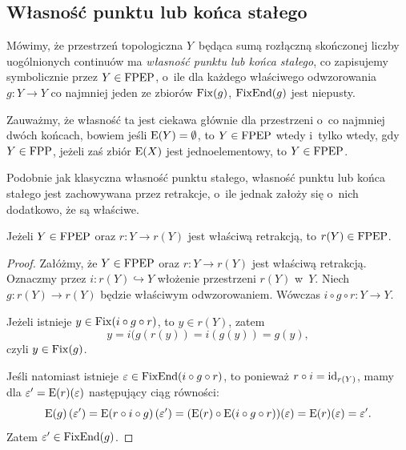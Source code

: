 


\subsection{Własność punktu lub końca stałego}
Mówimy, że przestrzeń topologiczna $Y$~będąca sumą rozłączną skończonej liczby uogólnionych continuów ma \textit{własność punktu lub końca stałego}, co zapisujemy symbolicznie przez $Y\in\mathrm{FPEP}$, o~ile dla każdego właściwego odwzorowania $g\colon Y\to Y$ co najmniej jeden ze zbiorów $\operatorname{Fix}(g)$, $\operatorname{FixEnd}(g)$ jest niepusty.

Zauważmy, że własność ta jest ciekawa głównie dla przestrzeni o~co najmniej dwóch końcach, bowiem jeśli $\mathrm{E}(Y)=\emptyset$, to $Y\in\mathrm{FPEP}$ wtedy i~tylko wtedy, gdy $Y\in\mathrm{FPP}$, jeżeli zaś zbiór $\mathrm{E}(X)$ jest  jednoelementowy, to $Y\in\mathrm{FPEP}$. 

Podobnie jak klasyczna własność punktu stałego, własność punktu lub końca stałego jest zachowywana przez retrakcje, o~ile jednak założy się o~nich dodatkowo, że są właściwe.

\begin{stw}\label{stw-wlasciwa_retrakcja_zachowuje_fpep}
Jeżeli $Y\in\mathrm{FPEP}$ oraz $r\colon Y\to r(Y)$ jest właściwą retrakcją, to $r(Y)\in\mathrm{FPEP}$.
\end{stw}
\begin{proof}
Załóżmy, że $Y\in\mathrm{FPEP}$ oraz $r\colon Y\to r(Y)$ jest właściwą retrakcją. Oznaczmy przez $i\colon r(Y)\hookrightarrow Y$ włożenie przestrzeni $r(Y)$ w~$Y$. Niech \mbox{$g\colon r(Y)\to r(Y)$} będzie właściwym odwzorowaniem. Wówczas $i\circ g\circ r\colon Y\to Y$.

Jeżeli istnieje $y\in \operatorname{Fix}(i\circ g\circ r)$, to $y\in r(Y)$, zatem \[y=i(g(r(y))=i(g(y))=g(y),\] czyli $y\in\operatorname{Fix}(g)$.

Jeśli natomiast istnieje $\varepsilon\in\operatorname{FixEnd}(i\circ g\circ r)$, to ponieważ $r\circ i=\operatorname{id}_{r(Y)}$, mamy dla $\varepsilon'=\mathrm{E}(r)(\varepsilon)$ następujący ciąg równości: \[\mathrm{E}(g)\left(\varepsilon'\right)=\mathrm{E}(r\circ i\circ g)\left(\varepsilon'\right)=(\mathrm{E}(r)\circ\mathrm{E}(i\circ g\circ r))(\varepsilon)=\mathrm{E}(r)(\varepsilon)=\varepsilon'.\]
Zatem $\varepsilon'\in\operatorname{FixEnd}(g)$.
\end{proof}

